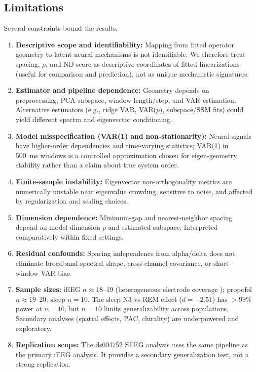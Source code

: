 \documentclass[preprint,12pt,nonatbib]{elsarticle}
\begin{document}
\subsection{Limitations}
Several constraints bound the results.
\begin{enumerate}[leftmargin=1.5em]
    \item \textbf{Descriptive scope and identifiability:} Mapping from fitted operator geometry to latent neural mechanisms is not identifiable. We therefore treat spacing, $\rho$, and ND score as descriptive coordinates of fitted linearizations (useful for comparison and prediction), not as unique mechanistic signatures.
    \item \textbf{Estimator and pipeline dependence:} Geometry depends on preprocessing, PCA subspace, window length/step, and VAR estimation. Alternative estimators (e.g., ridge VAR, VAR($p$), subspace/SSM fits) could yield different spectra and eigenvector conditioning.
    \item \textbf{Model misspecification (VAR(1) and non-stationarity):} Neural signals have higher-order dependencies and time-varying statistics; VAR(1) in 500~ms windows is a controlled approximation chosen for eigen-geometry stability rather than a claim about true system order.
    \item \textbf{Finite-sample instability:} Eigenvector non-orthogonality metrics are numerically unstable near eigenvalue crowding, sensitive to noise, and affected by regularization and scaling choices.
    \item \textbf{Dimension dependence:} Minimum-gap and nearest-neighbor spacing depend on model dimension $p$ and estimated subspace. Interpreted comparatively within fixed settings.
    \item \textbf{Residual confounds:} Spacing independence from alpha/delta does not eliminate broadband spectral shape, cross-channel covariance, or short-window VAR bias.
    \item \textbf{Sample sizes:} iEEG $n\approx18$--19 (heterogeneous electrode coverage \citep{Srinivasan2024}); propofol $n\approx19$--20; sleep $n=10$. The sleep N3-vs-REM effect ($d=-2.51$) has $>$99\% power at $n=10$, but $n=10$ limits generalizability across populations. Secondary analyses (spatial effects, PAC, chirality) are underpowered and exploratory.
    \item \textbf{Replication scope:} The ds004752 SEEG analysis uses the same pipeline as the primary iEEG analysis. It provides a secondary generalization test, not a strong replication.
\end{enumerate}
\end{document}
